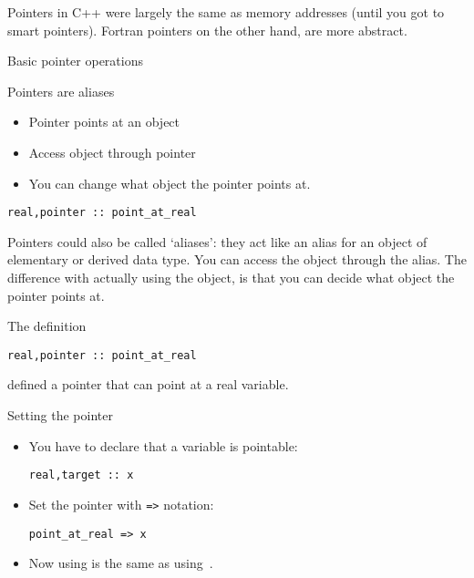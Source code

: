 
Pointers in C++ were largely the same as memory addresses (until you
got to smart pointers). Fortran pointers on the other hand, are more
abstract.

 {Basic pointer operations}

\begin{block}{Pointers are aliases}
  \begin{itemize}
  \item Pointer points at an object
  \item Access object through pointer
  \item You can change what object the pointer points at.
  \end{itemize}
\begin{verbatim}
real,pointer :: point_at_real
\end{verbatim}
\end{block}

Pointers could also be called `aliases': they act like an alias for an
object of elementary or derived data type. You can access the object
through the alias. The difference with actually using the object, is
that you can decide what object the pointer points at.

The  definition
\begin{verbatim}
real,pointer :: point_at_real
\end{verbatim}
defined a pointer that can point at a real variable.

\begin{block}{Setting the pointer}
  \begin{itemize}
  \item You have to declare that a variable is pointable:
\begin{verbatim}
real,target :: x
\end{verbatim}
\item Set the pointer with \verb+=>+ notation:
\begin{verbatim}
point_at_real => x
\end{verbatim}
\item Now using  is the same as using~.
  \end{itemize}
\end{block}

